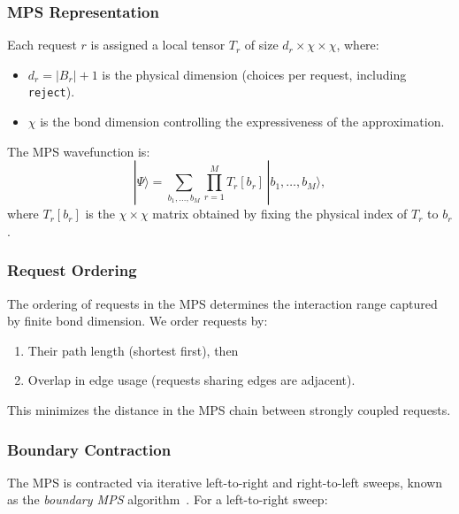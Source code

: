 \documentclass[10pt,a4paper]{article}
\begin{document}
\subsubsection{MPS Representation}

Each request $r$ is assigned a local tensor $T_r$ of size
$d_r \times \chi \times \chi$, where:
\begin{itemize}
  \item $d_r = |B_r| + 1$ is the physical dimension (choices per
    request, including \texttt{reject}).
  \item $\chi$ is the bond dimension controlling the expressiveness
    of the approximation.
\end{itemize}

The MPS wavefunction is:
\begin{equation}
  |\Psi\rangle = \sum_{b_1, \dots, b_M}
    \prod_{r=1}^M T_r[b_r] \, |b_1, \dots, b_M\rangle,
\label{eq:mps}
\end{equation}
where $T_r[b_r]$ is the $\chi \times \chi$ matrix obtained by fixing
the physical index of $T_r$ to $b_r$.

\subsubsection{Request Ordering}

The ordering of requests in the MPS determines the interaction range
captured by finite bond dimension.  We order requests by:
\begin{enumerate}
  \item Their path length (shortest first), then
  \item Overlap in edge usage (requests sharing edges are adjacent).
\end{enumerate}
This minimizes the distance in the MPS chain between strongly coupled
requests.

\subsubsection{Boundary Contraction}

The MPS is contracted via iterative left-to-right and right-to-left
sweeps, known as the \emph{boundary MPS} algorithm~\cite{vidal2003efficient}.
For a left-to-right sweep:
\end{document}
